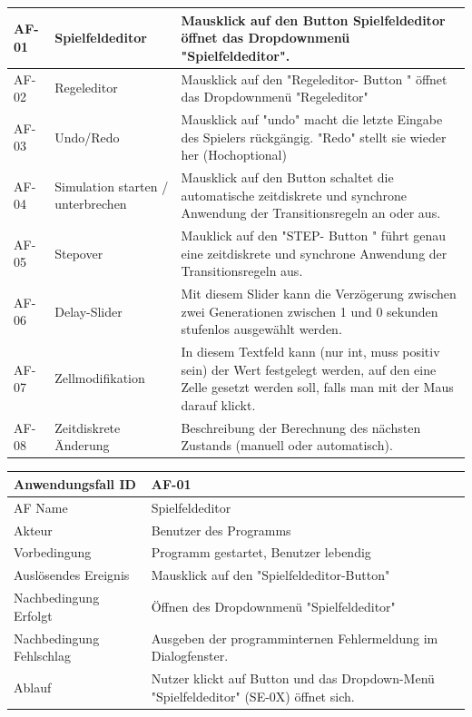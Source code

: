 \documentclass[11pt,a4paper]{article}
\begin{document}
\begin{longtable}[m]{|m{2cm}|m{4cm}|m{9cm}|}
\hline
 AF-01 & Spielfeldeditor & Mausklick auf den Button Spielfeldeditor öffnet das Dropdownmenü "Spielfeldeditor".   \\
 \hline
AF-02 & Regeleditor & Mausklick auf den "Regeleditor- Button " öffnet das Dropdownmenü "Regeleditor" \\
 \hline
AF-03& Undo/Redo& Mausklick auf "undo" macht die letzte Eingabe des Spielers rückgängig. "Redo" stellt sie wieder her (Hochoptional) \\
 \hline
 AF-04 & Simulation starten / unterbrechen & Mausklick auf den Button schaltet die automatische zeitdiskrete und synchrone Anwendung der Transitionsregeln an oder aus. \\
 \hline
 AF-05& Stepover & Mauklick auf den "STEP- Button " führt genau eine zeitdiskrete und synchrone Anwendung der Transitionsregeln aus.  \\

\hline
 AF-06 & Delay-Slider & Mit diesem Slider kann die Verzögerung zwischen zwei Generationen zwischen 1 und 0 sekunden stufenlos ausgewählt werden. \\
 \hline
 AF-07 & Zellmodifikation & In diesem Textfeld kann (nur int, muss positiv sein) der Wert festgelegt werden, auf den eine Zelle gesetzt werden soll, falls man mit der Maus darauf klickt.  \\
 \hline
 AF-08 & Zeitdiskrete Änderung & Beschreibung der Berechnung des nächsten Zustands (manuell oder automatisch).\\
\hline
\end{longtable}

\pagebreak

\begin{tabular}[m]{|m{7cm}|m{9cm}|}
    \hline
    Anwendungsfall ID     & AF-01 \\
         \hline
    AF Name     &  Spielfeldeditor \\
         \hline
    Akteur&Benutzer des Programms \\
    \hline
    Vorbedingung&Programm gestartet, Benutzer lebendig\\
    \hline
    Auslösendes Ereignis&Mausklick auf den "Spielfeldeditor-Button"\\
    \hline
    Nachbedingung Erfolgt&Öffnen des Dropdownmenü "Spielfeldeditor"\\
    \hline
    Nachbedingung Fehlschlag&Ausgeben der programminternen Fehlermeldung im Dialogfenster.\\
    \hline
    Ablauf&Nutzer klickt auf Button und das Dropdown-Menü "Spielfeldeditor" (SE-0X) öffnet sich.\\
    \hline
\end{tabular}
\par
\end{document}

